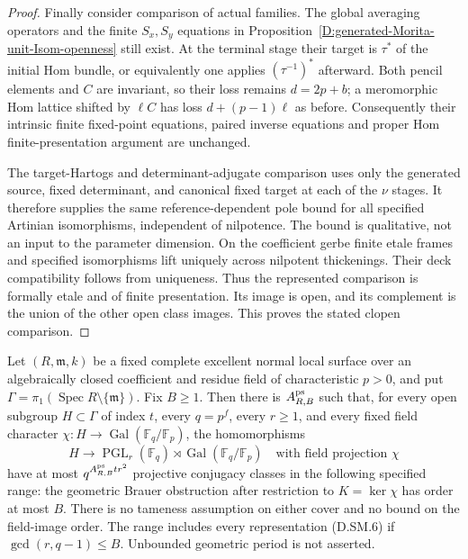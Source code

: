 \begin{proof}
Finally consider comparison of actual families.
The global averaging operators and the finite $S_x,S_y$
equations in
Proposition~\ref{D:generated-Morita-unit-Isom-openness}
still exist. At the terminal stage their target is
$\tau^*$ of the initial Hom bundle, or equivalently
one applies $(\tau^{-1})^*$ afterward. Both pencil
elements and $C$ are invariant, so their loss remains
$d=2p+b$; a meromorphic Hom lattice shifted by $\ell C$
has loss $d+(p-1)\ell$ as before. Consequently their
intrinsic finite fixed-point equations, paired inverse
equations and proper Hom finite-presentation argument
are unchanged.

The target-Hartogs and determinant-adjugate comparison
uses only the generated source, fixed determinant,
and canonical fixed target at each of the $\nu$ stages.
It therefore supplies the same reference-dependent
pole bound for all specified Artinian isomorphisms,
independent of nilpotence. The bound is qualitative,
not an input to the parameter dimension. On the
coefficient gerbe finite etale frames and specified
isomorphisms lift uniquely across nilpotent thickenings.
Their deck compatibility follows from uniqueness.
Thus the represented comparison is formally etale
and of finite presentation. Its image is open, and
its complement is the union of the other open class
images. This proves the stated clopen comparison.
\end{proof}

\begin{theorem}
\label{D:bounded-period-semilinear-hereditary-projective-growth}
Let $(R,\mathfrak m,k)$ be a fixed complete excellent
normal local surface over an algebraically closed
coefficient and residue field of characteristic $p>0$,
and put $\Gamma=\pi_1(\operatorname{Spec}R\setminus\{\mathfrak m\})$.
Fix $B\ge1$.
Then there is $A_{R,B}^{\rm ps}$ such that, for every
open subgroup $H\subset\Gamma$ of index $t$, every
$q=p^f$, every $r\ge1$, and every fixed field character
$\chi:H\to\operatorname{Gal}(\mathbb F_q/\mathbb F_p)$,
the homomorphisms
\[
 H\longrightarrow\operatorname{PGL}_r(\mathbb F_q)
                 \rtimes\operatorname{Gal}(\mathbb F_q/\mathbb F_p)
       \quad\text{with field projection }\chi
                                                        \tag{D.SM.6}
\]
have at most $q^{A_{R,B}^{\rm ps}tr^2}$ projective
conjugacy classes in the following specified range:
the geometric Brauer obstruction after restriction
to $K=\ker\chi$ has order at most $B$.
There is no tameness assumption on either cover and
no bound on the field-image order. The range includes
every representation (D.SM.6) if $\gcd(r,q-1)\le B$.
Unbounded geometric period is not asserted.
\end{theorem}

